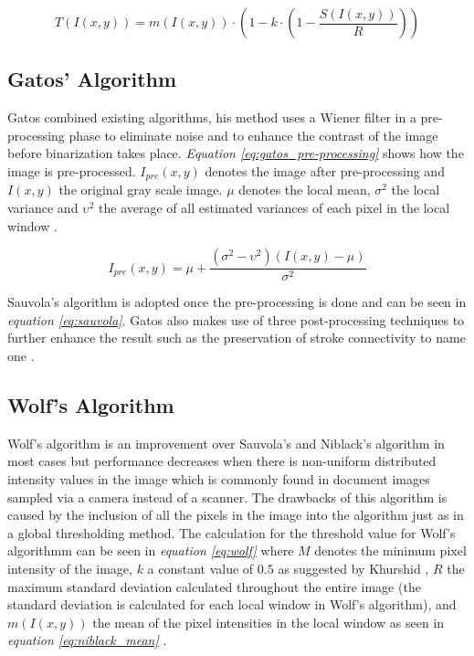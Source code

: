 \documentclass[11pt]{article}
\begin{document}
				\begin{large}
				\begin{equation} \label{eq:sauvola}
					T(I(x, y)) = m(I(x, y)) \cdot (1 - k \cdot (1 - \frac{S(I(x, y))}{R}))
				\end{equation}
				\end{large}

			\subsection{Gatos' Algorithm}
				Gatos combined existing algorithms, his method uses a Wiener filter in a pre-processing phase to eliminate noise and to enhance the contrast of the image before binarization takes place. \textit{Equation \ref{eq:gatos_pre-processing}} shows how the image is pre-processed. $I_{pre}(x,y)$ denotes the image after pre-processing and $I(x,y)$ the original gray scale image. $\mu$ denotes the local mean, $\sigma^2$ the local variance and $\upsilon^2$ the average of all estimated variances of each pixel in the local window \cite{pai2010adaptive}.

				\begin{large}
				\begin{equation} \label{eq:gatos_pre-processing}
					I_{pre}(x, y) = \mu + \frac{(\sigma^2 - \upsilon^2)(I(x,y)-\mu)}{\sigma^2}
				\end{equation}
				\end{large}

				Sauvola's algorithm is adopted once the pre-processing is done and can be seen in \textit{equation \ref{eq:sauvola}}. Gatos also makes use of three post-processing techniques to further enhance the result such as the preservation of stroke connectivity to name one \cite{pai2010adaptive}.

  		\subsection{Wolf's Algorithm}
  			Wolf's algorithm is an improvement over Sauvola's and Niblack's algorithm in most cases but performance decreases when there is non-uniform distributed intensity values in the image which is commonly found in document images sampled via a camera instead of a scanner. The drawbacks of this algorithm is caused by the inclusion of all the pixels in the image into the algorithm just as in a global thresholding method. The calculation for the threshold value for Wolf's algorithmm can be seen in \textit{equation \ref{eq:wolf}} where $M$ denotes the minimum pixel intensity of the image, $k$ a constant value of $0.5$ as suggested by Khurshid \cite{khurshid2009comparison}, $R$ the maximum standard deviation calculated throughout the entire image (the standard deviation is calculated for each local window in Wolf's algorithm), and $m(I(x, y))$ the mean of the pixel intensities in the local window as seen in \textit{equation \ref{eq:niblack_mean}} \cite{khurshid2009comparison}.
\end{document}
